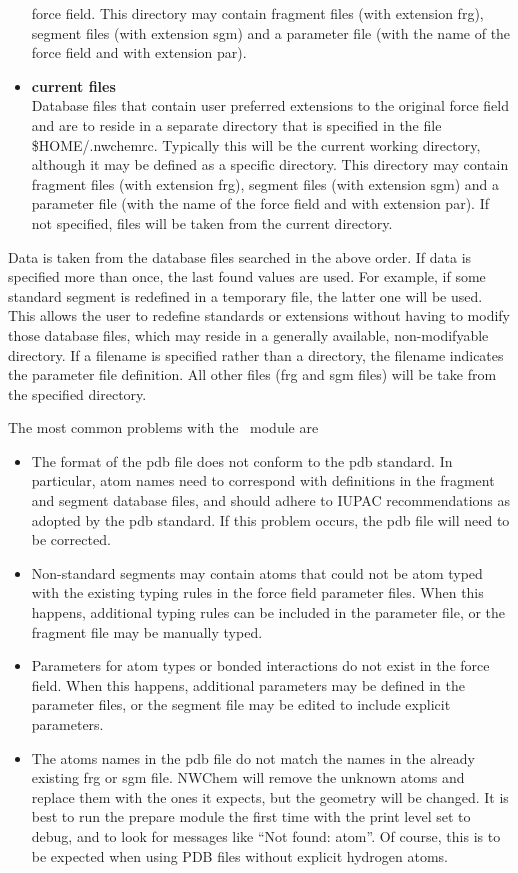 \begin{itemize}
force field. This directory may contain fragment files (with extension frg),
segment files (with extension sgm) and a parameter file (with the name
of the force field and with extension par).
\item[{\bf *}]
{\bf current files}\\
Database files that contain user preferred extensions to the original
force field and are to reside in a separate directory that is specified in 
the file \$HOME/.nwchemrc. Typically this will be the current working
directory, although it may be defined as a specific directory.
This directory may contain fragment files (with extension frg),
segment files (with extension sgm) and a parameter file (with the name
of the force field and with extension par). If not specified, 
files will be taken from the current directory.
\end{itemize}

Data is taken from the database files searched in the above order. If data
is specified more than once, the last found values are used. For example,
if some standard segment is redefined in a temporary file, the latter one
will be used. This allows the user to redefine standards or extensions 
without having to modify those database files, which may reside in a
generally available, non-modifyable directory. If a filename is specified
rather than a directory, the filename indicates the parameter file
definition. All other files (frg and sgm files) will be take from the
specified directory.
\par
The most common problems with the \prepare\ module are
\begin{itemize}
\item[{\bf ~}]
The format of the pdb file does not conform to the pdb standard. In
particular, atom names need to correspond with definitions in the
fragment and segment database files, and should adhere to IUPAC
recommendations as adopted by the pdb standard. If this problem
occurs, the pdb file will need to be corrected.
\item[{\bf ~}]
Non-standard segments may contain atoms that could not be atom typed
with the existing typing rules in the force field parameter files.
When this happens, additional typing rules can be included in the
parameter file, or the fragment file may be manually typed.
\item[{\bf ~}]
Parameters for atom types or bonded interactions do not exist in
the force field. When this happens, additional parameters may be
defined in the parameter files, or the segment file may be edited
to include explicit parameters.
\item[{\bf ~}]
The atoms names in the pdb file do not match the names in the
already existing frg or sgm file.  NWChem will remove the unknown
atoms and replace them with the ones it expects, but the geometry
will be changed.  It is best to run the prepare module the first time
with the print level set to debug, and to look for messages like
``Not found: atom''.  Of course, this is to be expected when 
using PDB files without explicit hydrogen atoms.
\end{itemize}

